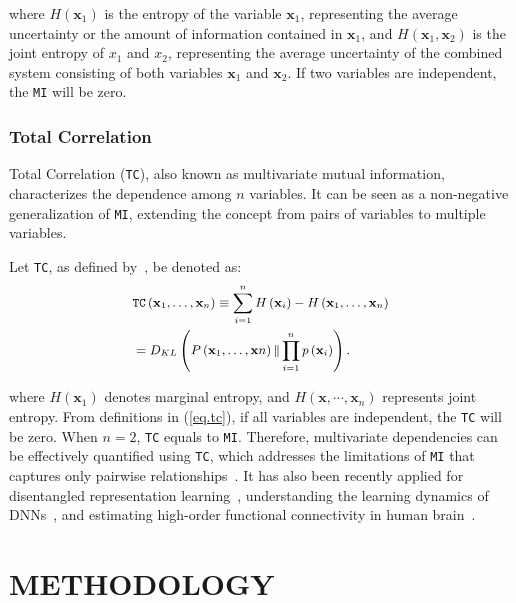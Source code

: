 \documentclass{article}
\begin{document}
\noindent where \( H(\mathbf{x}_1) \) is the entropy of the variable \(\mathbf{x}_1 \), representing the average uncertainty or the amount of information contained in \( \mathbf{x}_1 \), and \( H(\mathbf{x}_1, \mathbf{x}_2) \) is the joint entropy of \( x_1 \) and \( x_2 \), representing the average uncertainty of the combined system consisting of both variables \( \mathbf{x}_1 \) and \( \mathbf{x}_2 \). If two variables are independent, the \texttt{MI} will be zero.

\subsubsection{Total Correlation}
\hspace{1.2em} Total Correlation (\texttt{TC}), also known as multivariate mutual information, characterizes the dependence among $n$ variables. It can be seen as a non-negative generalization of \texttt{MI}, extending the concept from pairs of variables to multiple variables.

\noindent Let \texttt{TC}, as defined by~\cite{watanabe1960information}, be denoted as:
\begin{equation}\label{eq.tc}
\small
\begin{split}
   &\texttt{TC}\left(\mathbf{x}_1, \ldots, \mathbf{x}_{n}\right) \equiv \sum_{i=1}^n H\left(\mathbf{x}_{i}\right)-H\left(\mathbf{x}_1, \ldots, \mathbf{x}_{n}\right) \\ 
   &=D_{KL}\left(P\left(\mathbf{x}_1, \ldots, \mathbf{x}{n}\right) \| \prod_{i=1}^{n} p\left(\mathbf{x}_{i}\right)\right).
\end{split}
\end{equation}

\noindent where $H(\mathbf{x}_1 )$ denotes marginal entropy, and $H(\mathbf{x}, \cdots, \mathbf{x}_{n})$ represents joint entropy. From definitions in (\ref{eq.tc}), if all variables are independent, the \texttt{TC} will be zero. When \( n = 2 \), \texttt{TC} equals to \texttt{MI}. Therefore, multivariate dependencies can be effectively quantified using \texttt{TC}, which addresses the limitations of \texttt{MI} that captures only pairwise relationships~\cite{li2022functionalen,QiangVis}. It has also been recently applied for disentangled representation learning~\cite{chen2018isolating}, understanding the learning dynamics of DNNs~\cite{yu2021measuring}, and estimating high-order functional connectivity in human brain~\cite{gatica2021high,li2022functional,li2023aberrant}. 

\section{METHODOLOGY}
\end{document}
